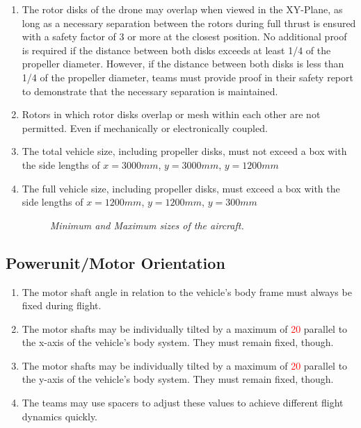 \documentclass{article}
\begin{document}
\begin{enumerate}
  \item The rotor disks of the drone may overlap when viewed in the XY-Plane, as long as a necessary separation between the rotors during full thrust is ensured with a safety factor of 3 or more at the closest position. No additional proof is required if the distance between both disks exceeds at least 1/4 of the propeller diameter. However, if the distance between both disks is less than 1/4 of the propeller diameter, teams must provide proof in their safety report to demonstrate that the necessary separation is maintained.  \item Rotors in which rotor disks overlap or mesh within each other are not permitted. Even if mechanically or electronically coupled.
  \item The total vehicle size, including propeller disks, must not exceed a box with the side lengths of $x=3000mm$, $y=3000mm$, $y=1200mm$
  \item The full vehicle size, including propeller disks, must exceed a box with the side lengths of $x=1200mm$, $y=1200mm$, $y=300mm$

  \begin{figure}[h!]
    \centering
    \caption{\textit{Minimum and Maximum sizes of the aircraft.}}
  \end{figure}
    
\end{enumerate}

\subsection{Powerunit/Motor Orientation}
\begin{enumerate}
  \item The motor shaft angle in relation to the vehicle's body frame must always be fixed during flight. 
  \item The motor shafts may be individually tilted by a maximum of \textcolor{red}{20\degree} parallel to the x-axis of the vehicle's body system. They must remain fixed, though.
  \item The motor shafts may be individually tilted by a maximum of \textcolor{red}{20\degree}  parallel to the y-axis of the vehicle's body system. They must remain fixed, though.
  \item The teams may use spacers to adjust these values to achieve different flight dynamics quickly.
\end{enumerate}
\end{document}
